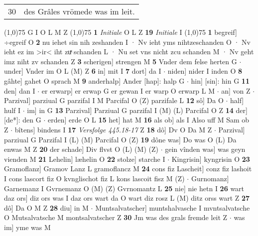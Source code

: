 \documentclass[8pt,a4paper,notitlepage]{article}
\begin{document}
\begin{table}[ht]
\begin{minipage}[t]{0.5\linewidth}
\begin{tabular}{rl}
30 & des Grâles vrömede was im leit.\\ 
\end{tabular}
\scriptsize
\line(1,0){75} \newline
G I O L M Z \newline
\line(1,0){75} \newline
\textbf{1} \textit{Initiale} O L Z  \textbf{19} \textit{Initiale} I  \newline
\line(1,0){75} \newline
\textbf{1} begreif] ÷egreif O \textbf{2} nu iehet sin nih zeshanden I · Nv ieht yms nihtzeschanden O · Nv ieht ez im >ir< iht zuͯ schanden L · Nu set vns nicht zcu schanden M · Nv geht imz niht zv schanden Z \textbf{3} scherigen] strengen M \textbf{5} Vnder dem felse herten G  $\cdot$ under] Vnder im O L (M) Z \textbf{6} in] mit I \textbf{7} dort] da I  $\cdot$ niden] nider I inden O \textbf{8} gâhte] gahet O sprach M \textbf{9} anderhalp] Ander [hap]: halp G  $\cdot$ hin] [sin]: hin G \textbf{11} den] dan I  $\cdot$ er erwarp] er erwap G er gewan I er warp O erwarp L M  $\cdot$ an] von Z  $\cdot$ Parzival] parziual G parzifal I M Parcifal O (Z) parzifale L \textbf{12} sô] Da O  $\cdot$ half] hulf I  $\cdot$ im] in G \textbf{13} Parzival] Parziual G parzifal I (M) (L) Parcifal O Z \textbf{14} der] [de*]: den G  $\cdot$ erden] erde O L \textbf{15} het] hat M \textbf{16} als ob] als I Also uff M Sam ob Z  $\cdot$ bîtens] bindens I \textbf{17} \textit{Versfolge 445.18-17} Z  \textbf{18} dô] Dv O Da M Z  $\cdot$ Parzival] parziual G Parzifal I (L) (M) Parcifal O (Z) \textbf{19} dône was] Do was O (L) Da enwas M Z \textbf{20} der schade] Div flvst O (L) (M) (Z)  $\cdot$ gein vînden was] was geyn vienden M \textbf{21} Lehelin] læhelin O \textbf{22} stolze] starche I  $\cdot$ Kingrisin] kyngrisin O \textbf{23} Gramoflanz] Gramov Lanz L gramoflancz M \textbf{24} cons fiz Lascheit] conz fiz lashoit I cons lascort fiz O kvnglischot fiz L kons lascoit fisz M (Z)  $\cdot$ Gurnomanz] Garnemanz I Gvrnemanz O (M) (Z) Gvrnomantz L \textbf{25} nie] nie hetn I \textbf{26} wart daz ors] diz ors was I daz ors wart da O wart diz rosz L (M) ditz orss wart Z \textbf{27} dô] Da O M Z \textbf{28} diu] in M  $\cdot$ Muntsalvatscher] muntshalvasche I mvntsalvatsche O Mutsalvatsche M montsalvatscher Z \textbf{30} Jm was des grals fremde leit Z  $\cdot$ was im] yme was M \newline
\end{minipage}
\hspace{0.5cm}
\begin{minipage}[t]{0.5\linewidth}

\end{minipage}
\end{table}
\end{document}
